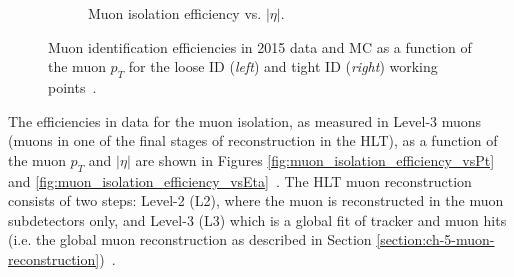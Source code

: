 \begin{figure}[ht]
\begin{subfigure}{0.45\textwidth}
        \caption{Muon isolation efficiency vs. $|\eta|$.}
        \label{fig:muon_tightID_efficiency}
    \end{subfigure}
    \caption[Muon identification efficiencies in 2015 data and MC as a function of the muon $p_{T}$ for the loose ID (\textit{left}) and tight ID (\textit{right}) working points.]{Muon identification efficiencies in 2015 data and MC as a function of the muon $p_{T}$ for the loose ID (\textit{left}) and tight ID (\textit{right}) working points~\cite{CMS-MUO-16-001}.} 
\end{figure}

The efficiencies in data for the muon isolation, as measured in Level-3 muons (muons in one of the final stages of reconstruction in the HLT), as a function of the muon $p_{T}$ and $|\eta|$ are shown in Figures \ref{fig:muon_isolation_efficiency_vsPt} and \ref{fig:muon_isolation_efficiency_vsEta}~\cite{CMS-MUO-16-001}. The HLT muon reconstruction consists of two steps: Level-2 (L2), where the muon is reconstructed in the muon subdetectors only, and Level-3 (L3) which is a global fit of tracker and muon hits (i.e. the global muon reconstruction as described in Section \ref{section:ch-5-muon-reconstruction})~\cite{Verwilligen-proceedings-2016}.

